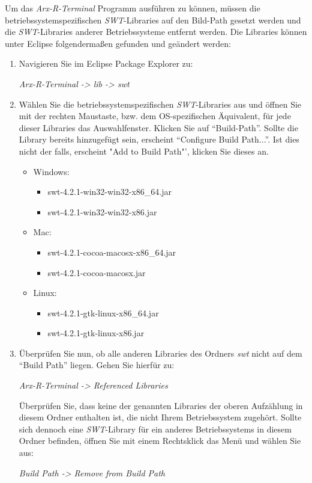 \documentclass[a4paper, 12pt]{report} %
\begin{document}
Um das \textit{Arx-R-Terminal} Programm ausführen zu können, müssen die betriebssystemspezifischen \textit{SWT}-Libraries auf den Bild-Path gesetzt werden und die \textit{SWT}-Libraries anderer Betriebssysteme entfernt werden.
Die Libraries können unter Eclipse folgendermaßen gefunden und geändert werden:
\begin{enumerate}
	\item Navigieren Sie im Eclipse Package Explorer zu:
	\begin{center}\textit{Arx-R-Terminal -> lib  -> swt} \end{center}
	
	\item Wählen Sie die betriebssystemspezifischen \textit{SWT}-Libraries aus und öffnen Sie mit der rechten Maustaste, bzw. dem OS-spezifischen Äquivalent, für jede dieser Libraries das Auswahlfenster. Klicken Sie auf "`Build-Path"'.
		Sollte die Library bereits hinzugefügt sein, erscheint "`Configure Build Path..."'. Ist dies nicht der falls, erscheint "Add to Build Path"', klicken Sie dieses an.
		
	\begin{itemize}
		\item Windows: \begin{itemize}
							\item swt-4.2.1-win32-win32-x86\_64.jar
							\item swt-4.2.1-win32-win32-x86.jar
						\end{itemize}
						
		\item Mac: \begin{itemize}
						\item swt-4.2.1-cocoa-macosx-x86\_64.jar
						\item swt-4.2.1-cocoa-macosx.jar
					\end{itemize}
		\item Linux: \begin{itemize}
						\item swt-4.2.1-gtk-linux-x86\_64.jar
						\item swt-4.2.1-gtk-linux-x86.jar
					 \end{itemize}
	\end{itemize} 
	
	\item Überprüfen Sie nun, ob alle anderen Libraries des Ordners \textit{swt} nicht auf dem "`Build Path"' liegen. 
		Gehen Sie hierfür zu:
		\begin{center}
			\textit{Arx-R-Terminal -> Referenced Libraries}
		\end{center} 
		
		Überprüfen Sie, dass keine der genannten Libraries der oberen Aufzählung in diesem Ordner enthalten ist, die nicht Ihrem Betriebssystem zugehört.
		Sollte sich dennoch eine \textit{SWT}-Library für ein anderes Betriebssystems in diesem Ordner befinden, öffnen Sie mit einem Rechtsklick das Menü und wählen Sie aus: 
		\begin{center}
			\textit{Build Path -> Remove from Build Path}
		\end{center}	
\end{enumerate}
\end{document}
